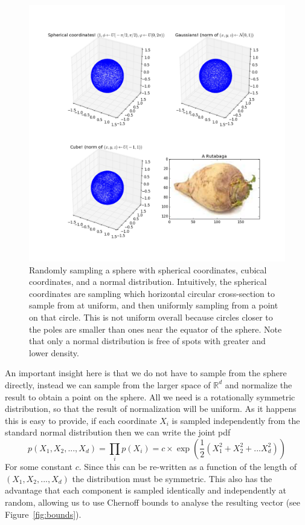 \documentclass[11pt]{article}
\newcommand{\R}{\mathbb{R}}
\begin{document}
\begin{figure}[p]
  \begin{center}
    \includegraphics[width=0.9\linewidth]{spheres.png}
  \end{center}

  \caption{Randomly sampling a sphere with spherical coordinates, cubical
    coordinates, and a normal distribution. Intuitively, the spherical
    coordinates are sampling which horizontal circular cross-section to sample
    from at uniform, and then uniformly sampling from a point on that circle.
    This is not uniform overall because circles closer to the poles are smaller
    than ones near the equator of the sphere. Note that only a normal distribution
    is free of spots with greater and lower density.}

  \label{fig:spheres}
\end{figure}

An important insight here is that we do not have to sample from the sphere
directly, instead we can sample from the larger space of $\R^d$ and normalize
the result to obtain a point on the sphere. All we need is a rotationally
symmetric distribution, so that the result of normalization will be uniform. As
it happens this is easy to provide, if each coordinate $X_i$ is sampled
independently from the standard normal distribution then we can write the joint
pdf
\[ p(X_1,X_2,...,X_d) = \prod_{i} p(X_i) = c \times \exp(\frac{1}{2} (X_1^2 + X_2^2 + ... X_d^2)) \]
For some constant $c$. Since this can be re-written as a function of the length
of $(X_1,X_2,...,X_d)$ the distribution must be symmetric. This also has the
advantage that each component is sampled identically and independently at
random, allowing us to use Chernoff bounds to analyse the resulting vector (see
Figure~\ref{fig:bounds}).
\end{document}
